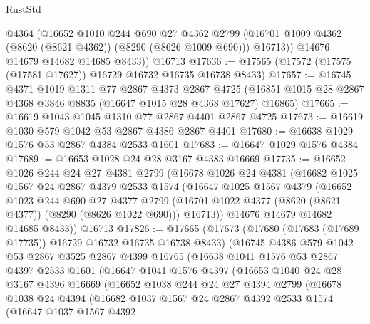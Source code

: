 \begin{lexlean}{RustStd}
\begin{coremodule}
          @4364
          (@16652
            @1010
            @244
            @690
            @27
            @4362
            @2799
            (@16701 @1009 @4362 (@8620 (@8621 @4362)) (@8290 (@8626 @1009 @690)))
            @16713))
        @14676
        @14679
        @14682
        @14685
        @8433))
    @16713
@17636 := @17565 (@17572 (@17575 (@17581 @17627)) @16729 @16732 @16735 @16738 @8433)
@17657 := @16745
    @4371
    @1019
    @1311
    @77
    @2867
    @4373
    @2867
    @4725
    (@16851 @1015 @28 @2867 @4368 @3846 @8835 (@16647 @1015 @28 @4368 @17627) @16865)
@17665 := @16619 @1043 @1045 @1310 @77 @2867 @4401 @2867 @4725
@17673 := @16619 @1030 @579 @1042 @53 @2867 @4386 @2867 @4401
@17680 := @16638 @1029 @1576 @53 @2867 @4384 @2533 @1601
@17683 := @16647 @1029 @1576 @4384
@17689 := @16653 @1028 @24 @28 @3167 @4383 @16669
@17735 := @16652
    @1026
    @244
    @24
    @27
    @4381
    @2799
    (@16678
      @1026
      @24
      @4381
      (@16682
        @1025
        @1567
        @24
        @2867
        @4379
        @2533
        @1574
        (@16647
          @1025
          @1567
          @4379
          (@16652
            @1023
            @244
            @690
            @27
            @4377
            @2799
            (@16701 @1022 @4377 (@8620 (@8621 @4377)) (@8290 (@8626 @1022 @690)))
            @16713))
        @14676
        @14679
        @14682
        @14685
        @8433))
    @16713
@17826 := @17665
    (@17673
      (@17680 (@17683 (@17689 @17735)) @16729 @16732 @16735 @16738 @8433)
      (@16745
        @4386
        @579
        @1042
        @53
        @2867
        @3525
        @2867
        @4399
        @16765
        (@16638
          @1041
          @1576
          @53
          @2867
          @4397
          @2533
          @1601
          (@16647
            @1041
            @1576
            @4397
            (@16653
              @1040
              @24
              @28
              @3167
              @4396
              @16669
              (@16652
                @1038
                @244
                @24
                @27
                @4394
                @2799
                (@16678
                  @1038
                  @24
                  @4394
                  (@16682
                    @1037
                    @1567
                    @24
                    @2867
                    @4392
                    @2533
                    @1574
                    (@16647
                      @1037
                      @1567
                      @4392

\end{coremodule}
\end{lexlean}
